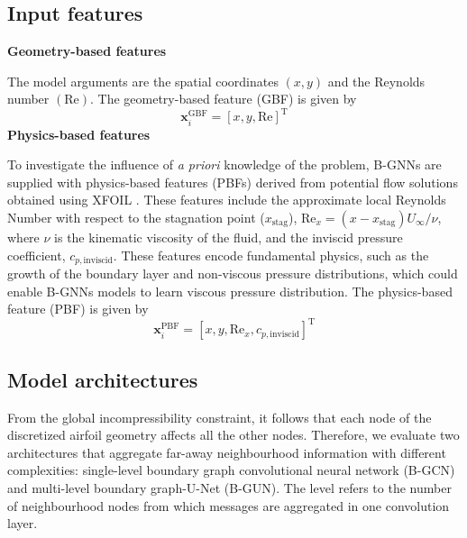 \documentclass{marine_2025_paper_template}
\begin{document}
\subsection{Input features}

\noindent \textbf{Geometry-based features}

The model arguments are the spatial coordinates $(x,y)$ and the Reynolds number $(\mathrm{Re})$. The geometry-based feature (GBF) is given by
        \begin{equation}
        \mathbf{x}^{\mathrm{GBF}}_i = [x,y,\mathrm{Re}]^\mathrm{T}
        \end{equation}
\newpage
\noindent \textbf{Physics-based features} 

To investigate the influence of \textit{a priori} knowledge of the problem, B-GNNs are supplied with physics-based features (PBFs) \citep{weymouth2013} derived from potential flow solutions obtained using XFOIL \citep{drela1989}. These features include the approximate local Reynolds Number with respect to the stagnation point ($x_\text{stag}$), $\mathrm{Re}_x = (x-x_\text{stag}) U_{\infty}/\nu$, where $\nu$ is the kinematic viscosity of the fluid, and the inviscid pressure coefficient, $c_{p,\text{inviscid}}$. These features encode fundamental physics, such as the growth of the boundary layer and non-viscous pressure distributions, which could enable B-GNNs models to learn viscous pressure distribution. The physics-based feature (PBF) is given by
        \begin{equation}
        \mathbf{x}^{\mathrm{PBF}}_i = [x,y,\mathrm{Re}_x, c_{p, \mathrm{inviscid}}]^\mathrm{T}
        \end{equation}
        
\subsection{Model architectures}

From the global incompressibility constraint, it follows that each node of the discretized airfoil geometry affects all the other nodes. Therefore, we evaluate two architectures that aggregate far-away neighbourhood information with different complexities: single-level boundary graph convolutional neural network (B-GCN) and multi-level boundary graph-U-Net (B-GUN). The level refers to the number of neighbourhood nodes from which messages are aggregated in one convolution layer.\newline 
\end{document}
